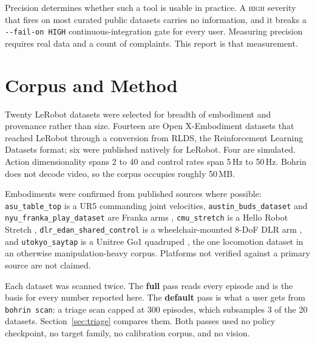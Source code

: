 \documentclass[10pt,a4paper]{article}
\newcommand{\dtr}[1]{\texttt{\small #1}}
\begin{document}
Precision determines whether such a tool is usable in practice. A \textsc{high} severity
that fires on most curated public datasets carries no information, and it breaks a
\texttt{-{}-fail-on HIGH} continuous-integration gate for every user. Measuring precision
requires real data and a count of complaints. This report is that measurement.

\section{Corpus and Method}

Twenty LeRobot datasets were selected for breadth of embodiment and provenance rather than
size. Fourteen are Open X-Embodiment datasets \cite{oxe} that reached LeRobot through a
conversion from RLDS, the Reinforcement Learning Datasets format; six were published
natively for LeRobot. Four are simulated. Action
dimensionality spans 2 to 40 and control rates span 5\,Hz to 50\,Hz. Bohrin does not decode
video, so the corpus occupies roughly 50\,MB.

Embodiments were confirmed from published sources where possible: \dtr{asu\_table\_top} is
a UR5 commanding joint velocities, \dtr{austin\_buds\_dataset} and
\dtr{nyu\_franka\_play\_dataset} are Franka arms \cite{tfds},
\dtr{cmu\_stretch} is a Hello Robot Stretch \cite{stretch}, \dtr{dlr\_edan\_shared\_control}
is a wheelchair-mounted 8-DoF DLR arm \cite{edan}, and \dtr{utokyo\_saytap} is a Unitree Go1
quadruped \cite{saytap}, the one locomotion dataset in an otherwise manipulation-heavy
corpus. Platforms not verified against a primary source are not claimed.

Each dataset was scanned twice. The \textbf{full} pass reads every episode and is the basis
for every number reported here. The \textbf{default} pass is what a user gets from
\texttt{bohrin scan}: a triage scan capped at 300 episodes, which subsamples 3 of the 20
datasets. Section~\ref{sec:triage} compares them. Both passes used no policy checkpoint, no
target family, no calibration corpus, and no vision.
\end{document}
